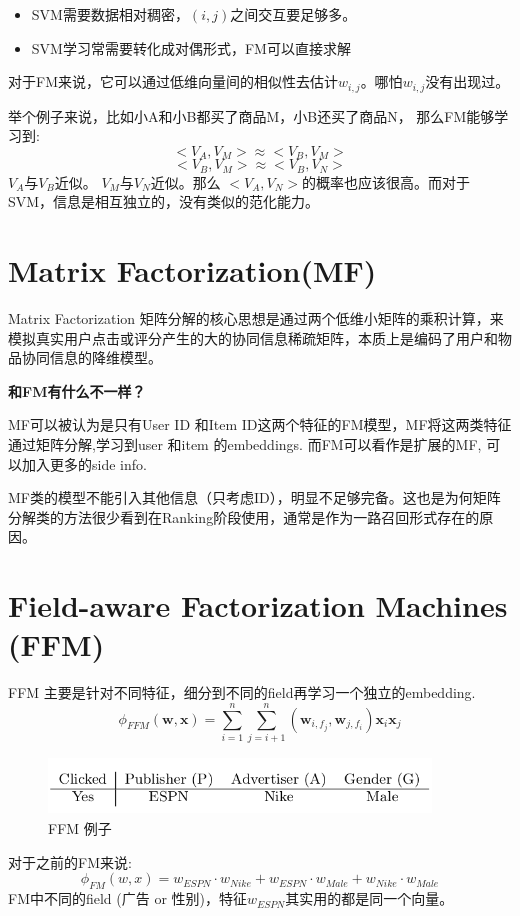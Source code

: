 \documentclass{article}
\begin{document}
\begin{CJK*}{UTF8}{gbsn}
\begin{itemize}
\item SVM需要数据相对稠密，$(i,j)$之间交互要足够多。
\item SVM学习常需要转化成对偶形式，FM可以直接求解
\end{itemize}

对于FM来说，它可以通过低维向量间的相似性去估计$w_{i,j}$。哪怕$w_{i,j}$没有出现过。

举个例子来说，比如小A和小B都买了商品M，小B还买了商品N， 那么FM能够学习到:
$$<V_{A},V_{M}> \approx <V_{B},V_{M}>$$
$$<V_{B},V_{M}> \approx <V_{B},V_{N}>$$
$V_{A}$与$V_{B}$近似。 $V_{M}$与$V_{N}$近似。那么 $<V_{A},V_{N}>$的概率也应该很高。而对于SVM，信息是相互独立的，没有类似的范化能力。

\section{Matrix Factorization(MF)}
Matrix Factorization 矩阵分解的核心思想是通过两个低维小矩阵的乘积计算，来模拟真实用户点击或评分产生的大的协同信息稀疏矩阵，本质上是编码了用户和物品协同信息的降维模型。

\noindent
\textbf{和FM有什么不一样？}

MF可以被认为是只有User ID 和Item ID这两个特征的FM模型，MF将这两类特征通过矩阵分解,学习到user 和item 的embeddings. 而FM可以看作是扩展的MF, 可以加入更多的side info. 

MF类的模型不能引入其他信息（只考虑ID），明显不足够完备。这也是为何矩阵分解类的方法很少看到在Ranking阶段使用，通常是作为一路召回形式存在的原因。

\section{Field-aware Factorization Machines (FFM)}
FFM \cite{DBLP:conf/recsys/JuanZCL16} 主要是针对不同特征，细分到不同的field再学习一个独立的embedding.
$$\phi_{FFM}(\textbf{w},\textbf{x})=\sum_{i=1}^{n} \sum_{j=i+1}^{n}(\textbf{w}_{i,f_{j}},\textbf{w}_{j,f_{i}})\textbf{x}_{i} \textbf{x}_{j}$$

\begin{figure}[H]
\centering
\includegraphics[width=4in,height=0.6in]{ffm1}
\caption{FFM 例子}
\end{figure}
\noindent
对于之前的FM来说:
$$\phi_{FM}(w,x)=w_{ESPN}\cdot w_{Nike}+w_{ESPN}\cdot w_{Male}+w_{Nike}\cdot w_{Male}$$
FM中不同的field (广告 or 性别)，特征$w_{ESPN}$其实用的都是同一个向量。


\end{CJK*}
\end{document}
